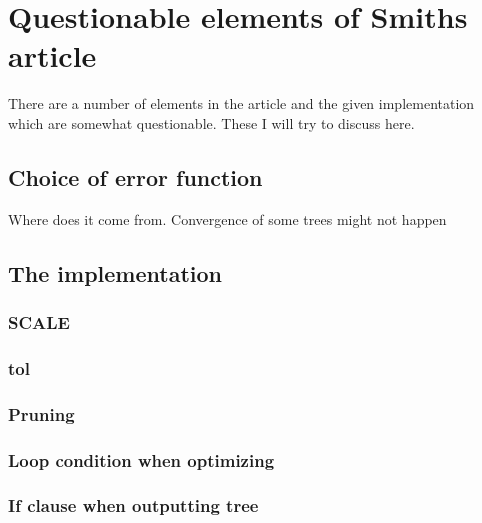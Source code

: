 \section{Questionable elements of Smiths article}
\label{sec:quest-elem-smiths}

There are a number of elements in the article and the given implementation~\cite{Smith1992} which are
somewhat questionable. These I will try to discuss here.

\subsection{Choice of error function}
\label{sec:choice-error-funct}
Where does it come from. Convergence of some trees might not happen

\subsection{The implementation}
\label{sec:implementation}

\subsubsection{SCALE}
\label{sec:scale}

\subsubsection{tol}
\label{sec:tol}

\subsubsection{Pruning}
\label{sec:pruning}

\subsubsection{Loop condition when optimizing}
\label{sec:loop-condition-when-1}

\subsubsection{If clause when outputting tree}
\label{sec:if-clause-when}

\chapterbreak{}

